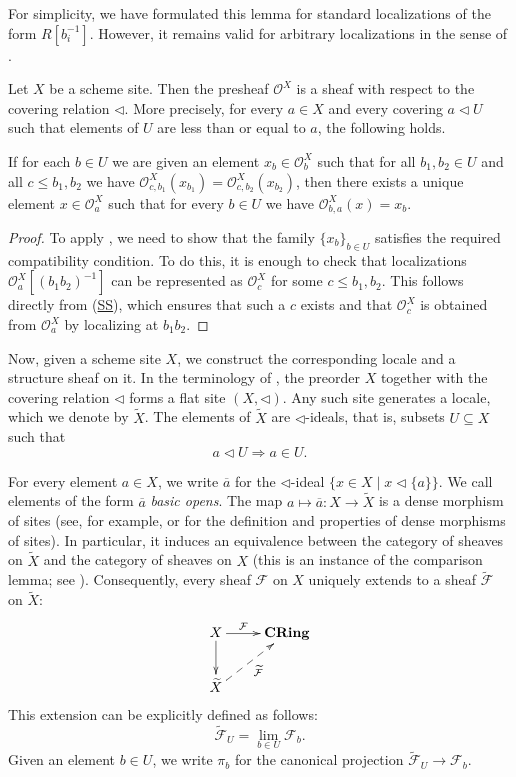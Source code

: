 \documentclass[reqno]{amsart}
\newcommand{\axref}[1]{(\hyperref[ax:#1]{#1})}
\theoremstyle{definition}
\theoremstyle{remark}
\numberwithin{figure}{section}
\newcommand{\cover}{\triangleleft}
\newcommand{\cat}[1]{\mathbf{#1}}
\begin{document}
For simplicity, we have formulated this lemma for standard localizations of the form $R[b_i^{-1}]$.
However, it remains valid for arbitrary localizations in the sense of .

\begin{lem}
Let $X$ be a scheme site.
Then the presheaf $\mathcal{O}^X$ is a sheaf with respect to the covering relation $\cover$.
More precisely, for every $a \in X$ and every covering $a \cover U$ such that elements of $U$ are less than or equal to $a$, the following holds.

If for each $b \in U$ we are given an element $x_b \in \mathcal{O}^X_b$ such that
for all $b_1,b_2 \in U$ and all $c \leq b_1,b_2$ we have $\mathcal{O}^X_{c,b_1}(x_{b_1}) = \mathcal{O}^X_{c,b_2}(x_{b_2})$,
then there exists a unique element $x \in \mathcal{O}^X_a$ such that for every $b \in U$ we have $\mathcal{O}^X_{b,a}(x) = x_b$.
\end{lem}
\begin{proof}
To apply , we need to show that the family $\{ x_b \}_{b \in U}$ satisfies the required compatibility condition.
To do this, it is enough to check that localizations $\mathcal{O}^X_a[(b_1 b_2)^{-1}]$ can be represented as $\mathcal{O}^X_c$ for some $c \leq b_1,b_2$.
This follows directly from \axref{SS}, which ensures that such a $c$ exists and that $\mathcal{O}^X_c$ is obtained from $\mathcal{O}^X_a$ by localizing at $b_1 b_2$.
\end{proof}

Now, given a scheme site $X$, we construct the corresponding locale and a structure sheaf on it.
In the terminology of \cite{vickers-compact}, the preorder $X$ together with the covering relation $\cover$ forms a flat site $(X,\cover)$.
Any such site generates a locale, which we denote by $\widetilde{X}$.
The elements of $\widetilde{X}$ are $\cover$-ideals, that is, subsets $U \subseteq X$ such that
\[
a \cover U \Rightarrow a \in U.
\]

For every element $a \in X$, we write $\overline{a}$ for the $\cover$-ideal $\{ x \in X \mid x \cover \{a\} \}$.
We call elements of the form $\overline{a}$ \emph{basic opens}.
The map $a \mapsto \overline{a} : X \to \widetilde{X}$ is a dense morphism of sites (see, for example, \cite[Section~11]{shulman-flat} or \cite[Section~9.4]{minichiello} for the definition and properties of dense morphisms of sites).
In particular, it induces an equivalence between the category of sheaves on $\widetilde{X}$ and the category of sheaves on $X$ (this is an instance of the comparison lemma; see \cite[Theorem~C2.2.3]{elephant}).
Consequently, every sheaf $\mathcal{F}$ on $X$ uniquely extends to a sheaf $\widetilde{\mathcal{F}}$ on $\widetilde{X}$:
\[ \xymatrix{ X \ar[r]^-{\mathcal{F}} \ar[d] & \cat{CRing} \\
              \widetilde{X} \ar@{-->}[ur]_{\widetilde{\mathcal{F}}}
            } \]
This extension can be explicitly defined as follows:
\[ \widetilde{\mathcal{F}}_U = \lim_{b \in U} \mathcal{F}_b. \]
Given an element $b \in U$, we write $\pi_b$ for the canonical projection $\widetilde{\mathcal{F}}_U \to \mathcal{F}_b$.
\end{document}
